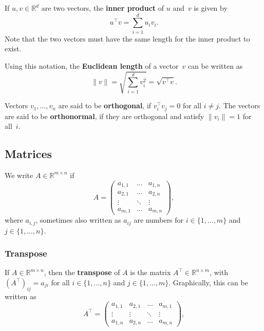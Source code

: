 \documentclass[
  a4paper,
]{article}
\theoremstyle{definition}
\theoremstyle{definition}
\theoremstyle{definition}
\theoremstyle{definition}
\theoremstyle{remark}
\begin{document}
If \(u,v\in\mathbb{R}^d\) are two vectors, the \textbf{inner product} of \(u\) and~\(v\)
is given by
\begin{equation}
  u^\top v
  = \sum_{i=1}^d u_i v_i.  \label{eq:inner-product}
\end{equation}
Note that the two vectors must have the same length for the inner product
to exist.

Using this notation, the \textbf{Euclidean length} of a vector~\(v\)
can be written as
\begin{equation*}
  \|v\|
  = \sqrt{\sum_{i=1}^d v_i^2}
  = \sqrt{v^\top v}.
\end{equation*}

Vectors \(v_1, \ldots, v_n\) are said to be \textbf{orthogonal},
if \(v_i^\top v_j = 0\) for all \(i \neq j\). The vectors are said to be
\textbf{orthonormal}, if they are orthogonal and satisfy \(\|v_i\| = 1\)
for all~\(i\).

\subsection{Matrices}\label{matrix-rules}

We write \(A \in \mathbb{R}^{m\times n}\) if
\begin{equation*}
  A
  = \begin{pmatrix}
    a_{1,1} & \ldots  & a_{1,n}\\
    a_{2,1} & \ldots  & a_{2,n}\\
    \vdots & \ddots  & \vdots\\
    a_{m,1} & \ldots  & a_{m,n}
  \end{pmatrix},
\end{equation*}
where \(a_{i,j}\), sometimes also written as \(a_{ij}\) are numbers
for \(i \in \{1, \ldots, m\}\) and \(j \in \{1, \ldots, n\}\).

\subsubsection{Transpose}\label{transpose}

If \(A \in \mathbb{R}^{m\times n}\), then the \textbf{transpose} of \(A\) is the matrix
\(A^\top \in \mathbb{R}^{n\times m}\), with \((A^\top)_{ij} = a_{ji}\) for all \(i
\in \{1, \ldots, n\}\) and \(j \in \{1, \ldots, m\}\). Graphically,
this can be written as
\begin{equation*}
  A^\top
  = \begin{pmatrix}
    a_{1,1} & a_{2,1} & \ldots  & a_{m,1} \\
    \vdots & \vdots & \ddots  & \vdots \\
    a_{1,n} & a_{2,n} & \ldots  & a_{m,n}
  \end{pmatrix},
\end{equation*}
\end{document}
